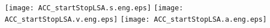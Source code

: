 \documentclass[a4paper,12pt]{article}
\begin{document}

\begin{center}
\texttt{[image: ACC\_startStopLSA.s.eng.eps]} 
\texttt{[image: ACC\_startStopLSA.v.eng.eps]}
\texttt{[image: ACC\_startStopLSA.a.eng.eps]}
\end{center}

\end{document}
